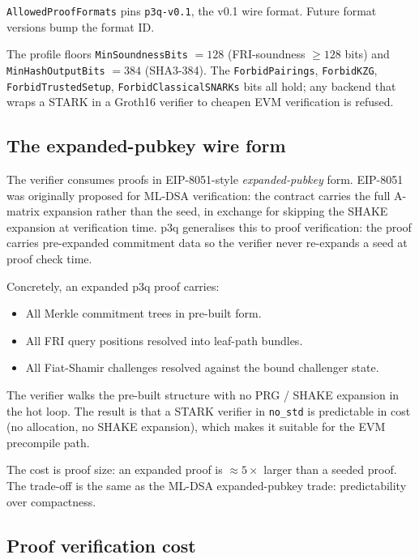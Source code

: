 \texttt{AllowedProofFormats} pins \texttt{p3q-v0.1}, the v0.1 wire format.
Future format versions bump the format ID.

The profile floors \texttt{MinSoundnessBits} $= 128$ (FRI-soundness $\ge
128$ bits) and \texttt{MinHashOutputBits} $= 384$ (SHA3-384). The
\texttt{ForbidPairings}, \texttt{ForbidKZG}, \texttt{ForbidTrustedSetup},
\texttt{ForbidClassicalSNARKs} bits all hold; any backend that wraps a
STARK in a Groth16 verifier to cheapen EVM verification is refused.

\subsection{The expanded-pubkey wire form}

The verifier consumes proofs in EIP-8051-style \emph{expanded-pubkey} form.
EIP-8051 \cite{eip8051} was originally proposed for ML-DSA verification:
the contract carries the full A-matrix expansion rather than the seed, in
exchange for skipping the SHAKE expansion at verification time. p3q
generalises this to proof verification: the proof carries pre-expanded
commitment data so the verifier never re-expands a seed at proof check
time.

Concretely, an expanded p3q proof carries:

\begin{itemize}[leftmargin=2em,nosep]
  \item All Merkle commitment trees in pre-built form.
  \item All FRI query positions resolved into leaf-path bundles.
  \item All Fiat-Shamir challenges resolved against the bound challenger
    state.
\end{itemize}

The verifier walks the pre-built structure with no PRG / SHAKE expansion in
the hot loop. The result is that a STARK verifier in \texttt{no\_std} is
predictable in cost (no allocation, no SHAKE expansion), which makes it
suitable for the EVM precompile path.

The cost is proof size: an expanded proof is $\approx 5\times$ larger than
a seeded proof. The trade-off is the same as the ML-DSA expanded-pubkey
trade: predictability over compactness.

\subsection{Proof verification cost}

